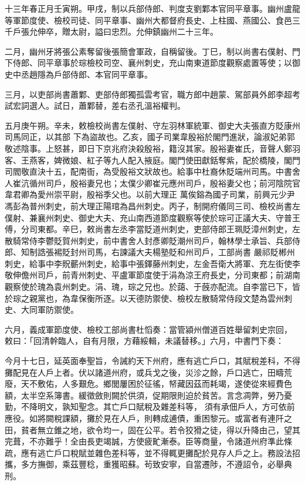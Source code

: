 \begin{pinyinscope}
 十三年春正月壬寅朔。甲戌，制以兵部侍郎、判度支劉鄴本官同平章事。幽州盧龍等軍節度使、檢校司徒、同平章事、幽州大都督府長史、上柱國、燕國公、食邑三千戶張允伸卒，贈太尉，謚曰忠烈。允伸鎮幽州二十三年。



 二月，幽州牙將張公素奪留後張簡會軍政，自稱留後。丁巳，制以尚書右僕射、門下侍郎、同平章事於琮檢校司空、襄州刺史，充山南東道節度觀察處置等使；以御史中丞趙隱為戶部侍郎、本官同平章事。



 三月，以吏部尚書蕭鄴、吏部侍郎獨孤雲考官，職方郎中趙蒙、駕部員外郎李超考試宏詞選人。試日，蕭鄴替，差右丞孔溫裕權判。



 五月庚午朔。辛未，敕檢校尚書左僕射、守左羽林軍統軍、御史大夫張直方貶康州司馬同正，以其部
 下為盜故也。乙亥，國子司業韋殷裕於閣門進狀，論淑妃弟郭敬述陰事。上怒甚，即日下京兆府決殺殷裕，籍沒其家。殷裕妻崔氏，音聲人鄭羽客、王燕客，婢微娘、紅子等九人配入掖庭。閣門使田獻銛奪紫，配於橋陵，閣門司閻敬直決十五，配南衙，為受殷裕文狀故也。給事中杜裔休貶端州司馬。中書舍人崔沆循州司戶，殷裕妻兄也；太僕少卿崔元應州司戶，殷裕妻父也；前河陰院官韋君卿為愛州崇平尉，殷裕季父也。以前大理正
 萬俟鎔為國子司業，前興元少尹馮彭為普州刺史，前大理正陽琯為昌州刺史。丙子，制開府儀同三司、檢校尚書左僕射、兼襄州刺史、御史大夫、充山南西道節度觀察等使於琮可正議大夫、守普王傅，分司東都。辛巳，敕尚書左丞李當貶道州刺史，吏部侍郎王珮貶漳州刺史，左散騎常侍李鬱貶賀州刺史，前中書舍人封彥卿貶潮州司戶，翰林學士承旨、兵部侍郎、知制誥張裼貶封州司馬，右諫議大夫楊塾貶和州司戶，工部尚書
 嚴祁貶郴州刺史，給事中李貺蘄州刺史，給事中張鐸藤州刺史，左金吾衛大將軍、充左街使李敬伸儋州司戶，前青州刺史、平盧軍節度使于涓為涼王府長史，分司東都；前湖南觀察使於瑰為袁州刺史。涓、瑰，琮之兄也。於藹、于蔇亦配流。自李當已下，皆於琮之親黨也，為韋保衡所逐。以天德防禦使、檢校左散騎常侍段文楚為雲州刺史、大同軍防禦使。



 六月，義成軍節度使、檢校工部尚書杜慆奏：當管潁州僧道百姓舉留刺史宗回，
 敕曰：「回清幹臨人，自有月限，方藉綏輯，未議替移。」六月，中書門下奏：



 今月十七日，延英面奉聖旨，令誡約天下州府，應有逃亡戶口，其賦稅差科，不得攤配見在人戶上者。伏以諸道州府，或兵戈之後，災沴之餘，戶口逃亡，田疇荒廢，天不敷佑，人多艱危。鄉閭屢困於征徭，帑藏因茲而耗竭，遂使從來經費色額，太半空系簿書。緩徵斂則闕於供須，促期限則迫於貧苦。言念凋弊，勞乃憂勤，不降明文，孰知聖念。其亡戶口賦稅及雜差科等，
 須有承佃戶人，方可依前應役。如將闕稅課額，攤於見在人戶，則轉成逋債，重困黎元。或富者有連阡之田，貧者無立錐之地，欲令均一，固在公平。若令狡猾之徒，得以升降由己，望其完葺，不亦難乎！全由長吏竭誠，方使疲甿漸泰。臣等商量，令諸道州府準此條疏，應有逃亡戶口稅賦並雜色差科等，並不得輒更攤配於見存人戶之上。務設法招攜，多方撫御，乘茲豐稔，重獲昭蘇。茍致安寧，自當遷陟，不遵詔令，必舉典刑。




\end{pinyinscope}

